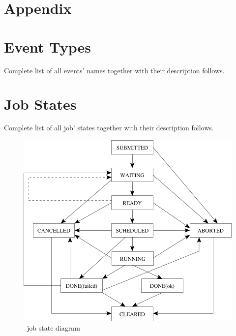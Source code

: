 \section*{Appendix}

\section{\LB Event Types}
\label{a:events}
Complete list of all events' names together with their description follows.


\newpage
\section{\LB Job States}
\label{a:jobstat}
Complete list of all job' states together with their description follows.


\begin{figure}[hb]
\centering
\includegraphics[width=.6\hsize]{images/wms2-jobstat}
\caption{\LB\ job state diagram}
\end{figure}
